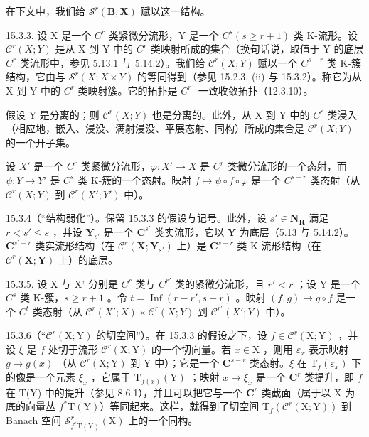 在下文中，我们给 \(\mathcal{S}^{r}(\mathbf{B};\mathbf{X})\) 赋以这一结构。

15.3.3. 设 X 是一个 \(C^{r}\) 类紧微分流形，Y 是一个 \(C^{s}(s \geqslant r + 1)\) 类 K-流形。设 \(\mathcal{C}^{r}(X; Y)\) 是从 X 到 Y 中的 \(C^{r}\) 类映射所成的集合（换句话说，取值于 Y 的底层 \(C^{r}\) 类流形中，参见 5.13.1 与 5.14.2）。我们给 \(\mathcal{C}^{r}(X; Y)\) 赋以一个 \(C^{s-r}\) 类 K-簇结构，它由与 \(\mathcal{S}^{r}(X; X \times Y)\) 的等同得到（参见 15.2.3, (ii) 与 15.3.2）。称它为从 X 到 Y 中的 \(C^{r}\) 类映射簇。它的拓扑是 \(C^{r}\) -一致收敛拓扑（12.3.10）。

假设 Y 是分离的；则 \(\mathcal{C}^{r}(X;Y)\) 也是分离的。此外，从 X 到 Y 中的 \(C^{r}\) 类浸入（相应地，嵌入、浸没、满射浸没、平展态射、同构）所成的集合是 \(\mathcal{C}^{r}(X;Y)\) 的一个开子集。

设 \(X'\) 是一个 \(C^r\) 类紧微分流形，\(\varphi: X' \to X\) 是 \(C^r\) 类微分流形的一个态射，而 \(\psi: Y \to Y'\) 是 \(C^s\) 类 K-簇的一个态射。映射 \(f \mapsto \psi \circ f \circ \varphi\) 是一个 \(C^{s-r}\) 类态射（从 \(\mathscr{C}^r(X; Y)\) 到 \(\mathscr{C}^r(X'; Y')\) 中）。

15.3.4（“结构弱化”）。保留 15.3.3 的假设与记号。此外，设 \(s' \in \mathbf{N}_{\mathbf{R}}\) 满足 \(r < s' \leqslant s\) ，并设 \(\mathbf{Y}_{s'}\) 是一个 \(\mathbf{C}^{s'}\) 类实流形，它以 \(\mathbf{Y}\) 为底层（5.13 与 5.14.2）。\(\mathbf{C}^{s'-r}\) 类实流形结构（在 \(\mathcal{C}^r(\mathbf{X}; \mathbf{Y}_{s'})\) 上）是 \(\mathbf{C}^{s-r}\) 类 K-流形结构（在 \(\mathcal{C}^r(\mathbf{X}; \mathbf{Y})\) 上）的底层。

15.3.5. 设 X 与 X' 分别是 \(C^{r}\) 类与 \(C^{r'}\) 类的紧微分流形，且 \(r' < r\) ；设 Y 是一个 \(C^{s}\) 类 K-簇，\(s \geqslant r + 1\) 。令 \(t = \operatorname{Inf}(r - r', s - r)\) 。映射 \((f, g) \mapsto g \circ f\) 是一个 \(C^{t}\) 类态射（从 \(\mathcal{C}^{r}(X'; X) \times \mathcal{C}^{r}(X; Y)\) 到 \(\mathcal{C}^{r'}(X'; Y)\) 中）。

15.3.6（“\(\mathcal{C}^r (\mathrm{X};\mathrm{Y})\) 的切空间”）。在 15.3.3 的假设之下，设 \(f\in \mathcal{C}^r (\mathrm{X};\mathrm{Y})\) ，并设 \(\xi\) 是 \(f\) 处切于流形 \(\mathcal{C}^r (\mathrm{X};\mathrm{Y})\) 的一个切向量。若 \(x\in \mathrm{X}\) ，则用 \(\varepsilon_{x}\) 表示映射 \(g\mapsto g(x)\) （从 \(\mathcal{C}^r (\mathrm{X};\mathrm{Y})\) 到 Y 中）；它是一个 \(\mathbf{C}^{s - r}\) 类态射。\(\xi\) 在 \(\mathrm{T}_f(\varepsilon_x)\) 下的像是一个元素 \(\xi_{x}\) ，它属于 \(\mathrm{T}_{f(x)}(\mathrm{Y})\) ；映射 \(x\mapsto \xi_{x}\) 是一个 \(\mathbf{C}^r\) 类提升，即 \(f\) 在 T(Y) 中的提升（参见 8.6.1），并且可以把它与一个 \(\mathbf{C}^r\) 类截面（属于以 X 为底的向量丛 \(f^{*}\mathrm{T}(\mathrm{Y})\)）等同起来。这样，就得到了切空间 \(\mathrm{T}_f(\mathcal{C}^r (\mathrm{X};\mathrm{Y}))\) 到 Banach 空间 \(\mathcal{S}_{f^{*}\mathrm{T}(\mathrm{Y})}^r (\mathrm{X})\) 上的一个同构。

